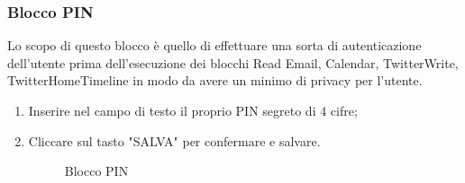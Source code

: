 \subsubsection{Blocco PIN}
Lo scopo di questo blocco è quello di effettuare una sorta di autenticazione dell'utente prima dell'esecuzione dei blocchi Read Email, Calendar, TwitterWrite, TwitterHomeTimeline in modo da avere un minimo di privacy per l'utente.
\begin{enumerate}
	\item Inserire nel campo di testo il proprio PIN segreto di 4 cifre;
	\item Cliccare sul tasto "SALVA" per confermare e salvare.
	
	\begin{figure}[!ht]
		\centering
		\caption{Blocco PIN}
	\end{figure}
\end{enumerate}
\newpage

